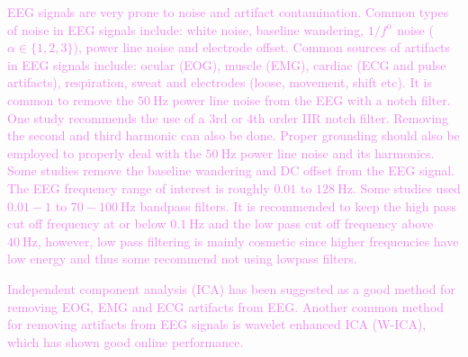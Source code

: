 \textcolor{violet}{EEG signals are very prone to noise and artifact contamination\:\cite{islamSignalArtifactsTechniques2021}. Common types of noise in EEG signals include: white noise, baseline wandering, $1/f^\alpha$ noise ($\alpha \in \{1,2,3\}$), power line noise and electrode offset\:\cite{islamSignalArtifactsTechniques2021}. Common sources of artifacts in EEG signals include: ocular (EOG), muscle (EMG), cardiac (ECG and pulse artifacts), respiration, sweat and electrodes (loose, movement, shift etc)\:\cite{islamSignalArtifactsTechniques2021}\cite{khoslaComparativeAnalysisSignal2020}\cite{minguillonTrendsEEGBCIDailylife2017}\cite{mannanIdentificationRemovalPhysiological2018}\cite{pedroniAutomagicStandardizedPreprocessing2019}.}
\textcolor{violet}{It is common to remove the $50\:\text{Hz}$ power line noise from the EEG with a notch filter\:\cite{gordleevaRealTimeEEGEMG2020}\cite{khoslaComparativeAnalysisSignal2020}\cite{zhangEEGEMGEOGBased2019}. One study recommends the use of a $3$rd or $4$th order IIR notch filter\:\cite{islamSignalArtifactsTechniques2021}. Removing the second and third harmonic can also be done\:\cite{islamSignalArtifactsTechniques2021}. Proper grounding should also be employed to properly deal with the $50\:\text{Hz}$ power line noise and its harmonics\:\cite{islamSignalArtifactsTechniques2021}.}
\textcolor{violet}{Some studies remove the baseline wandering and DC offset from the EEG signal\:\cite{islamSignalArtifactsTechniques2021}\cite{zhangEEGEMGEOGBased2019}.}
\textcolor{violet}{The EEG frequency range of interest is roughly $0.01$ to $128\:\text{Hz}$\:\cite{islamSignalArtifactsTechniques2021}\cite{mannanIdentificationRemovalPhysiological2018}.}
\textcolor{violet}{Some studies used $0.01-1$ to $70-100\:\text{Hz}$ bandpass filters\:\cite{leebHybridBrainComputer2011}\textcolor{olive}{\cite{tangSpatialFilterTemporal2024}}\cite{khoslaComparativeAnalysisSignal2020}.}
\textcolor{violet}{It is recommended to keep the high pass cut off frequency at or below $0.1\:\text{Hz}$ and the low pass cut off frequency above $40\:\text{Hz}$, however, low pass filtering is mainly cosmetic since higher frequencies have low energy and thus some recommend not using lowpass filters\:\cite{vanrullenFourCommonConceptual2011}\cite{widmannDigitalFilterDesign2015}.}

\textcolor{violet}{Independent component analysis (ICA) has been suggested as a good method for removing EOG, EMG and ECG artifacts from EEG\:\cite{hongHybridBrainComputer2017}\textcolor{olive}{\cite{minguillonTrendsEEGBCIDailylife2017}}\cite{mannanIdentificationRemovalPhysiological2018}.}
\textcolor{violet}{Another common method for removing artifacts from EEG signals is wavelet enhanced ICA (W-ICA), which has shown good online performance\:\cite{islamSignalArtifactsTechniques2021}\textcolor{olive}{\cite{minguillonTrendsEEGBCIDailylife2017}}\cite{dalyFORCeFullyOnline2015}\cite{gabard-durnamHarvardAutomatedProcessing2018}.}

